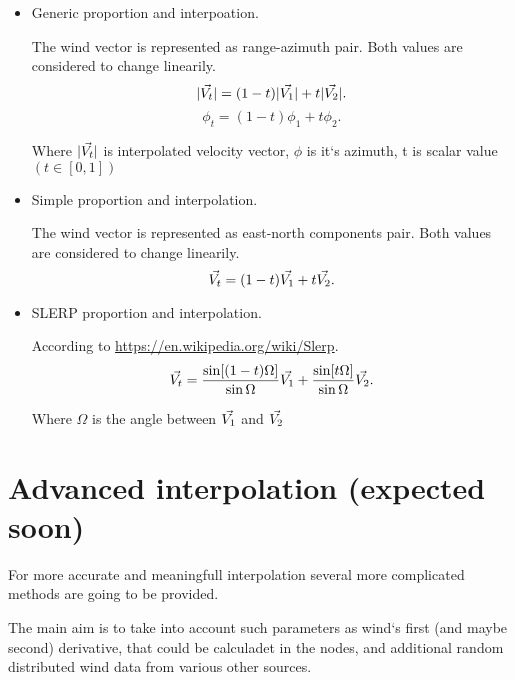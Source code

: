 \begin{itemize}
 \item Generic proportion and interpoation. 
 
 The wind vector is represented as range-azimuth pair. Both values are considered to change linearily.
 \begin{equation}
  |{{\vec{V_t}}}| = (1 - t)|{{\vec{V_1}}}| + t|{{\vec{V_2}}}|.
 \end{equation}
 \begin{equation}
   \phi _t = (1 - t)\phi_1 + t\phi_2.
 \end{equation}
 
 Where $|{{\vec{V_t}}}|$ is interpolated velocity vector, $\phi$ is it`s azimuth, t is scalar value $( t\in[0, 1] )$
 
 \item Simple proportion and interpolation.
 
 The wind vector is represented as east-north components pair. Both values are considered to change linearily.
 \begin{equation}
  {{\vec{V_t}}} = (1 - t){{\vec{V_1}}} + t{{\vec{V_2}}}.
 \end{equation}
 
 \item SLERP proportion and interpolation.
 
 According to \url{https://en.wikipedia.org/wiki/Slerp}.
 \begin{equation}
  {{\vec{V_t}}} = \frac{\sin[(1 - t)\Omega]}{\sin\Omega}{{\vec{V_1}}} + \frac{\sin[t\Omega]}{\sin\Omega}{{\vec{V_2}}}.
 \end{equation}
 
 Where $\Omega$ is the angle between ${{\vec{V_1}}}$ and ${{\vec{V_2}}}$
 
\end{itemize}


\section{Advanced interpolation (expected soon)}

For more accurate and meaningfull interpolation several more complicated methods are going to be provided.

The main aim is to take into account such parameters as wind`s first (and maybe second) derivative, that could be calculadet in the nodes, 
and additional random distributed wind data from various other sources.